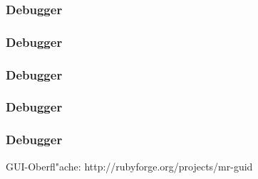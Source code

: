 \documentclass{beamer}
\begin{document}
\lstset{language=Ruby}
\lstset{basicstyle=\small,numbers=none, numberstyle=\tiny, numbersep=5pt}

\begin{frame}
  \frametitle{Debugger}
  
\end{frame}

\begin{frame}
  \frametitle{Debugger}
  
\end{frame}

\begin{frame}
  \frametitle{Debugger}
  
\end{frame}

\begin{frame}
  \frametitle{Debugger}
  
\end{frame}

\begin{frame}
  \frametitle{Debugger}
  GUI-Oberfl"ache: http://rubyforge.org/projects/mr-guid 
\end{frame}

\end{document}
